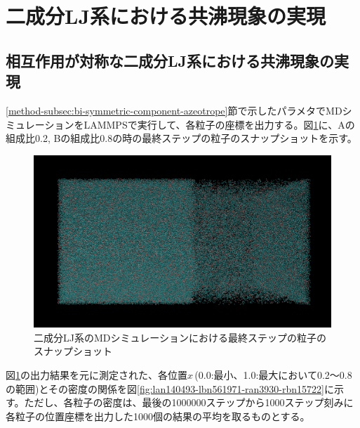 \documentclass[titlepage]{jsreport}
\begin{document}
\section{二成分LJ系における共沸現象の実現} \label{results-sec:bi-component-azeotrope}
\subsection{相互作用が対称な二成分LJ系における共沸現象の実現} \label{results-subsec:bi-symmetric-component-azeotrope}
\ref{method-subsec:bi-symmetric-component-azeotrope}節で示したパラメタでMDシミュレーションをLAMMPSで実行して、各粒子の座標を出力する。図\ref{fig:lan140493-lbn561971-ran3930-rbn15722-last}に、Aの組成比0.2, Bの組成比0.8の時の最終ステップの粒子のスナップショットを示す。

\begin{figure}[htbp]
    \begin{center}
        \includegraphics[width=14cm]{fig/lan140493-lbn561971-ran3930-rbn15722/lan140493-lbn561971-ran3930-rbn15722-last.png}
    \end{center}
    \caption{二成分LJ系のMDシミュレーションにおける最終ステップの粒子のスナップショット}
    \label{fig:lan140493-lbn561971-ran3930-rbn15722-last}
\end{figure}

\newpage
図\ref{fig:lan140493-lbn561971-ran3930-rbn15722-last}の出力結果を元に測定された、各位置$x$\,(0.0:最小、1.0:最大において0.2〜0.8の範囲)とその密度の関係を図\ref{fig:lan140493-lbn561971-ran3930-rbn15722}に示す。ただし、各粒子の密度は、最後の1000000ステップから1000ステップ刻みに各粒子の位置座標を出力した1000個の結果の平均を取るものとする。
\end{document}
